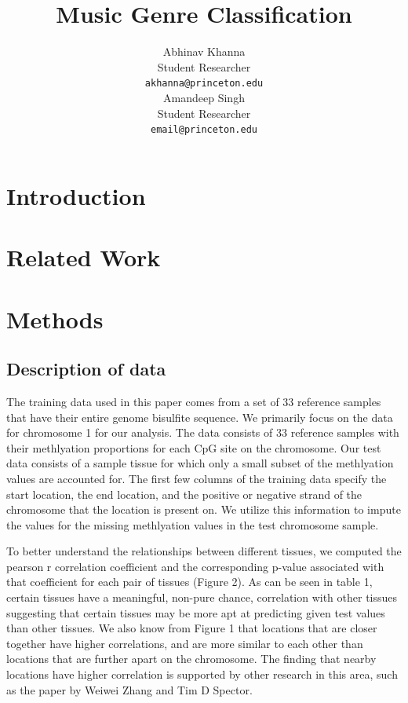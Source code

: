\documentclass{article} %
\title{Music Genre Classification}
\author{
Abhinav Khanna\\
Student Researcher\\
\texttt{akhanna@princeton.edu} \\
\And
Amandeep Singh \\
Student Researcher \\
\texttt{email@princeton.edu} \\
}
\begin{document}
\maketitle

\begin{abstract}
\end{abstract}

\section{Introduction}


\section{Related Work}


\section{Methods}
\subsection{Description of data}
The training data used in this paper comes from a set of 33 reference samples that have their entire genome bisulfite sequence. We primarily focus on the data for chromosome 1 for our analysis. The data consists of 33 reference samples with their methlyation proportions for each CpG site on the chromosome. Our test data consists of a sample tissue for which only a small subset of the methlyation values are accounted for. The first few columns of the training data specify the start location, the end location, and the positive or negative strand of the chromosome that the location is present on. We utilize this information to impute the values for the missing methlyation values in the test chromosome sample.

To better understand the relationships between different tissues, we computed the pearson r correlation coefficient and the corresponding p-value associated with that coefficient for each pair of tissues (Figure 2). As can be seen in table 1, certain tissues have a meaningful, non-pure chance, correlation with other tissues suggesting that certain tissues may be more apt at predicting given test values than other tissues. We also know from Figure 1 that locations that are closer together have higher correlations, and are more similar to each other than locations that are further apart on the chromosome. The finding that nearby locations have higher correlation is supported by other research in this area, such as the paper by Weiwei Zhang and Tim D Spector. 
\end{document}
